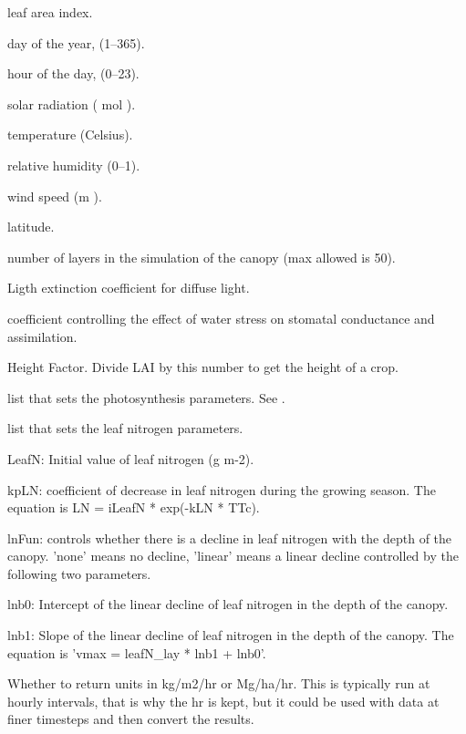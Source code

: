 \documentclass[letterpaper]{book}
\begin{document}
\begin{Arguments}
\begin{ldescription}
\item[\code{lai}] leaf area index.

\item[\code{doy}] day of the year, (1--365).

\item[\code{hr}] hour of the day, (0--23).

\item[\code{solar}] solar radiation (\eqn{\mu}{} mol
 ).

\item[\code{temp}] temperature (Celsius).

\item[\code{rh}] relative humidity (0--1).

\item[\code{windspeed}] wind speed (m ).

\item[\code{lat}] latitude.

\item[\code{nlayers}] number of layers in the simulation of the
canopy (max allowed is 50).

\item[\code{kd}] Ligth extinction coefficient for diffuse
light.

\item[\code{StomataWS}] coefficient controlling the effect of
water stress on stomatal conductance and assimilation.

\item[\code{heightFactor}] Height Factor. Divide LAI by this
number to get the height of a crop.

\item[\code{photoControl}] list that sets the photosynthesis
parameters. See .

\item[\code{lnControl}] list that sets the leaf nitrogen
parameters.

LeafN: Initial value of leaf nitrogen (g m-2).

kpLN: coefficient of decrease in leaf nitrogen during the
growing season. The equation is LN = iLeafN * exp(-kLN *
TTc).

lnFun: controls whether there is a decline in leaf
nitrogen with the depth of the canopy. 'none' means no
decline, 'linear' means a linear decline controlled by
the following two parameters.

lnb0: Intercept of the linear decline of leaf nitrogen in
the depth of the canopy.

lnb1: Slope of the linear decline of leaf nitrogen in the
depth of the canopy. The equation is 'vmax = leafN\_lay *
lnb1 + lnb0'.

\item[\code{units}] Whether to return units in kg/m2/hr or
Mg/ha/hr. This is typically run at hourly intervals, that
is why the hr is kept, but it could be used with data at
finer timesteps and then convert the results.
\end{ldescription}
\end{Arguments}
\end{document}
